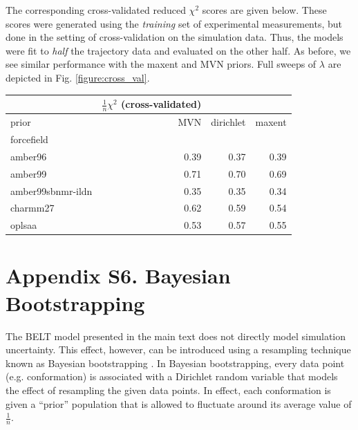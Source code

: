 \documentclass[12pt]{article}
\begin{document}
\vspace{5mm}

The corresponding cross-validated reduced $\chi^2$ scores are given below.  These scores were generated using the \emph{training} set of experimental measurements, but done in the setting of cross-validation on the simulation data.  Thus, the models were fit to \emph{half} the trajectory data and evaluated on the other half.  As before, we see similar performance with the maxent and MVN priors.  Full sweeps of $\lambda$ are depicted in Fig. \ref{figure:cross_val}.  

\vspace{5mm}


\begin{tabular}{lrrr}
\toprule
{} &  $\frac{1}{n}\chi^2$ (cross-validated) & &          \\
\midrule
prior &       MVN &  dirichlet & maxent  \\
forcefield        &           &  &       \\
amber96           &      0.39 &       0.37 &    0.39 \\
amber99           &      0.71 &       0.70 &    0.69 \\
amber99sbnmr-ildn &      0.35 &       0.35 &    0.34 \\
charmm27          &      0.62 &       0.59 &    0.54 \\
oplsaa            &      0.53 &       0.57 &    0.55 \\
\bottomrule
\end{tabular}

\newpage

\section*{Appendix S6.  Bayesian Bootstrapping}

The BELT model presented in the main text does not directly model simulation uncertainty.  This effect, however, can be introduced using a resampling technique known as Bayesian bootstrapping \cite{rubin1981}.  In Bayesian bootstrapping, every data point (e.g. conformation) is associated with a Dirichlet random variable that models the effect of resampling the given data points.  In effect, each conformation is given a ``prior'' population that is allowed to fluctuate around its average value of $\frac{1}{n}$.  
\end{document}
